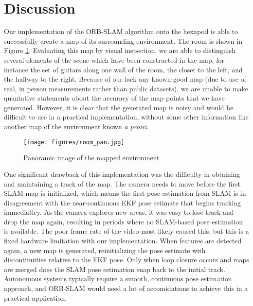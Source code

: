 
\section{ Discussion }

Our implementation of the ORB-SLAM algorithm onto the hexapod is able to successfully create a map of its surrounding environment. The room is shown in Figure \ref{fig:room}. Evaluating this map by visual inspection, we are able to distinguish several elements of the scene which have been constructed in the map, for instance the set of guitars along one wall of the room, the closet to the left, and the hallway to the right. Because of our lack any known-good map (due to use of real, in person measurements rather than public datasets), we are unable to make quantative statements about the accuracy of the map points that we have generated. However, it is clear that the generated map is noisy and would be difficult to use in a practical implementation, without some other information like another map of the environment known \emph{a proiri}.

\begin{figure}[h]
    \centering
    \texttt{[image: figures/room\_pan.jpg]}
    \caption{ Panoramic image of the mapped environment }
    \label{fig:room}
\end{figure}

One significant drawback of this implementation was the difficulty in obtaining and maintaining a track of the map. The camera needs to move before the first SLAM map is initialized, which means the first pose estimation from SLAM is in disagreement with the near-continuous EKF pose estimate that begins tracking immediatley. As the camera explores new areas, it was easy to lose track and drop the map again, resulting in periods where no SLAM-based pose estimation is available. The poor frame rate of the video most likely caused this, but this is a fixed hardware limitation with our implementation. When features are detected again, a new map is generated, reinitializing the pose estimate with discontinuities relative to the EKF pose. Only when loop closure occurs and maps are merged does the SLAM pose estimation snap back to the initial track. Autonomous systems typically require a smooth, continuous pose estimation approach, and ORB-SLAM would need a lot of accomidations to achieve this in a practical application.

